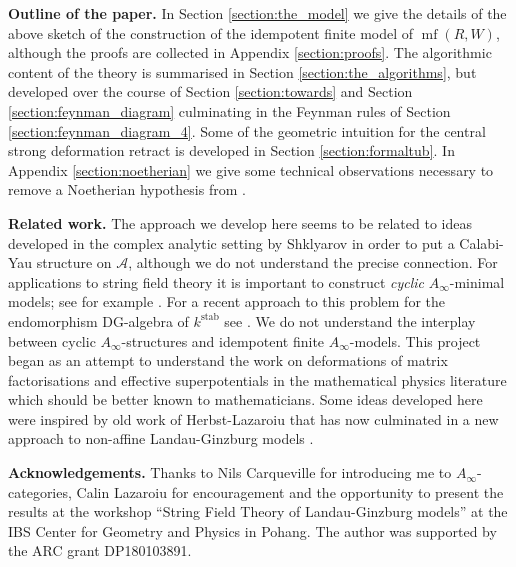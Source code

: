 \documentclass[english,letter paper,12pt,leqno]{article}
\theoremstyle{example}
\numberwithin{equation}{section}
\def\AA{\mathcal{A}}
\def\stab{\operatorname{stab}}
\begin{document}
\vspace{0.3cm}

\textbf{Outline of the paper.} In Section \ref{section:the_model} we give the details of the above sketch of the construction of the idempotent finite model of $\operatorname{mf}(R,W)$, although the proofs are collected in Appendix \ref{section:proofs}. The algorithmic content of the theory is summarised in Section \ref{section:the_algorithms}, but developed over the course of Section \ref{section:towards} and Section \ref{section:feynman_diagram} culminating in the Feynman rules of Section \ref{section:feynman_diagram_4}. Some of the geometric intuition for the central strong deformation retract is developed in Section \ref{section:formaltub}. In Appendix \ref{section:noetherian} we give some technical observations necessary to remove a Noetherian hypothesis from \cite{cut}.

\vspace{0.3cm}

\textbf{Related work.} The approach we develop here seems to be related to ideas developed in the complex analytic setting by Shklyarov \cite{shklyarov_cy} in order to put a Calabi-Yau structure on $\AA$, although we do not understand the precise connection. For applications to string field theory it is important to construct \emph{cyclic} $A_\infty$-minimal models; see for example \cite{carqueville}. For a recent approach to this problem for the endomorphism DG-algebra of $k^{\stab}$ see \cite{tu}. We do not understand the interplay between cyclic $A_\infty$-structures and idempotent finite $A_\infty$-models. This project began as an attempt to understand the work on deformations of matrix factorisations and effective superpotentials in the mathematical physics literature \cite{baumgartl1, baumgartl2, baumgartl3, baumgartl4, carqueville2, carqueville3, knapp} which should be better known to mathematicians. Some ideas developed here were inspired by old work of Herbst-Lazaroiu \cite{herbst} that has now culminated in a new approach to non-affine Landau-Ginzburg models \cite{babalic}.

\vspace{0.3cm}

\textbf{Acknowledgements.} Thanks to Nils Carqueville for introducing me to $A_\infty$-categories, Calin Lazaroiu for encouragement and the opportunity to present the results at the workshop ``String Field Theory of Landau-Ginzburg models'' at the IBS Center for Geometry and Physics in Pohang. The author was supported by the ARC grant DP180103891.
\end{document}

